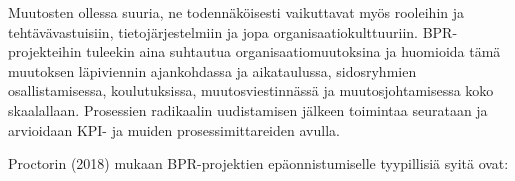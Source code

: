 \documentclass[
  finnish,
  letterpaper,
  DIV=11,
  numbers=noendperiod,
  oneside]{scrreprt}
\begin{document}
Muutosten ollessa suuria, ne todennäköisesti vaikuttavat myös rooleihin
ja tehtävävastuisiin, tietojärjestelmiin ja jopa
organisaatiokulttuuriin. BPR-projekteihin tuleekin aina suhtautua
organisaatiomuutoksina ja huomioida tämä muutoksen läpiviennin
ajankohdassa ja aikataulussa, sidosryhmien osallistamisessa,
koulutuksissa, muutosviestinnässä ja muutosjohtamisessa koko
skaalallaan. Prosessien radikaalin uudistamisen jälkeen toimintaa
seurataan ja arvioidaan KPI- ja muiden prosessimittareiden avulla.

Proctorin (2018) mukaan BPR-projektien epäonnistumiselle tyypillisiä
syitä ovat:
\end{document}
